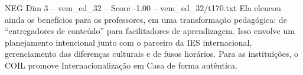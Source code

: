 \begin{textsample}{NEG Dim 3 – vem\_ed\_32 – Score -1.00 – vem\_ed\_32/t170.txt}
Ela elencou ainda os benefícios para os professores, em uma transformação pedagógica: de “entregadores de conteúdo” para facilitadores de aprendizagem.
Isso envolve um planejamento intencional junto com o parceiro da IES internacional, gerenciamento das diferenças culturais e de fusos horários.
Para as instituições, o COIL promove Internacionalização em Casa de forma autêntica.

\end{textsample}
